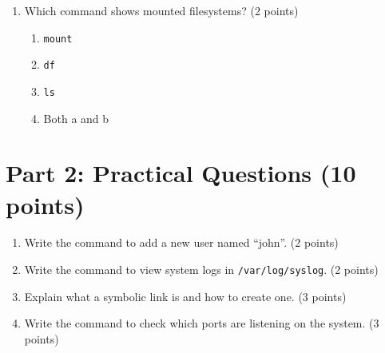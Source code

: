 \documentclass[11pt,a4paper]{article}
\begin{document}
{\begin{enumerate}[label=\textbf{\arabic*.}]
    \item Which command shows mounted filesystems? (2 points)
    \begin{enumerate}[label=(\alph*)]
        \item \texttt{mount}
        \item \texttt{df}
        \item \texttt{ls}
        \item Both a and b
    \end{enumerate}
\end{enumerate}

\section*{Part 2: Practical Questions (10 points)}

\begin{enumerate}[label=\textbf{\arabic*.}, resume]
    \item Write the command to add a new user named ``john''. (2 points)
    
    \vspace{2cm}
    
    \item Write the command to view system logs in \texttt{/var/log/syslog}. (2 points)
    
    \vspace{2cm}
    
    \item Explain what a symbolic link is and how to create one. (3 points)
    
    \vspace{3cm}
    
    \item Write the command to check which ports are listening on the system. (3 points)
    
    \vspace{3cm}
\end{enumerate}
}
\end{document}

